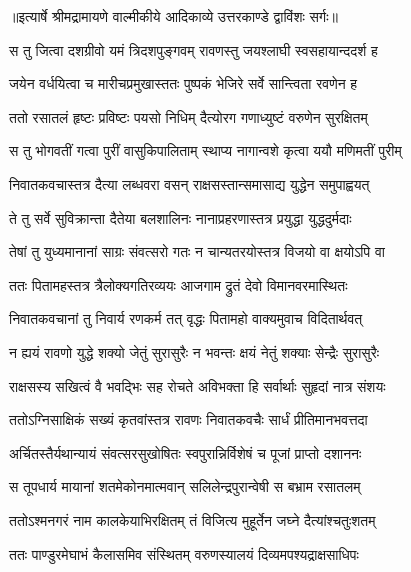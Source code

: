 {॥इत्यार्षे श्रीमद्रामायणे वाल्मीकीये आदिकाव्ये उत्तरकाण्डे द्वाविंशः सर्गः॥}


\twolineshloka
{स तु जित्वा दशग्रीवो यमं त्रिदशपुङ्गवम्}
{रावणस्तु जयश्लाघी स्वसहायान्ददर्श ह} %

\twolineshloka
{जयेन वर्धयित्वा च मारीचप्रमुखास्ततः}
{पुष्पकं भेजिरे सर्वे सान्त्विता रवणेन ह} %

\twolineshloka
{ततो रसातलं हृष्टः प्रविष्टः पयसो निधिम्}
{दैत्योरग गणाध्युष्टं वरुणेन सुरक्षितम्} %

\twolineshloka
{स तु भोगवतीं गत्वा पुरीं वासुकिपालिताम्}
{स्थाप्य नागान्वशे कृत्वा ययौ मणिमतीं पुरीम्} %

\twolineshloka
{निवातकवचास्तत्र दैत्या लब्धवरा वसन्}
{राक्षसस्तान्समासाद्य युद्धेन समुपाह्वयत्} %

\twolineshloka
{ते तु सर्वे सुविक्रान्ता दैतेया बलशालिनः}
{नानाप्रहरणास्तत्र प्रयुद्धा युद्धदुर्मदाः} %

\twolineshloka
{तेषां तु युध्यमानानां साग्रः संवत्सरो गतः}
{न चान्यतरयोस्तत्र विजयो वा क्षयोऽपि वा} %

\twolineshloka
{ततः पितामहस्तत्र त्रैलोक्यगतिरव्ययः}
{आजगाम द्रुतं देवो विमानवरमास्थितः} %

\twolineshloka
{निवातकवचानां तु निवार्य रणकर्म तत्}
{वृद्धः पितामहो वाक्यमुवाच विदितार्थवत्} %

\twolineshloka
{न ह्ययं रावणो युद्धे शक्यो जेतुं सुरासुरैः}
{न भवन्तः क्षयं नेतुं शक्याः सेन्द्रैः सुरासुरैः} %

\twolineshloka
{राक्षसस्य सखित्वं वै भवद्भिः सह रोचते}
{अविभक्ता हि सर्वार्थाः सुहृदां नात्र संशयः} %

\twolineshloka
{ततोऽग्निसाक्षिकं सख्यं कृतवांस्तत्र रावणः}
{निवातकवचैः सार्धं प्रीतिमानभवत्तदा} %

\twolineshloka
{अर्चितस्तैर्यथान्यायं संवत्सरसुखोषितः}
{स्वपुरान्निर्विशेषं च पूजां प्राप्तो दशाननः} %

\twolineshloka
{स तूपधार्य मायानां शतमेकोनमात्मवान्}
{सलिलेन्द्रपुरान्वेषी स बभ्राम रसातलम्} %

\twolineshloka
{ततोऽश्मनगरं नाम कालकेयाभिरक्षितम्}
{तं विजित्य मुहूर्तेन जघ्ने दैत्यांश्चतुःशतम्} %

\twolineshloka
{ततः पाण्डुरमेघाभं कैलासमिव संस्थितम्}
{वरुणस्यालयं दिव्यमपश्यद्राक्षसाधिपः} %

